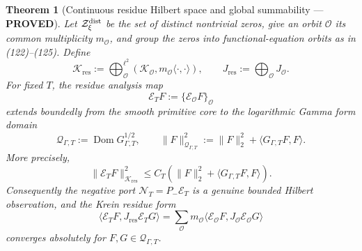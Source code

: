 \documentclass[11pt]{article}
\newtheorem{theorem}{Theorem}
\newcommand{\PROVED}{\textcolor{green!45!black}{\textbf{PROVED}}}
\begin{document}
\begin{theorem}[Continuous residue Hilbert space and global summability ---
\PROVED]
Let \(\mathcal Z_\xi^{\rm dist}\) be the set of distinct nontrivial
zeros, give an orbit \(\mathcal O\) its common multiplicity
\(m_{\mathcal O}\), and group the zeros into functional-equation orbits as
in (122)--(125).  Define
\begin{equation}
 \mathscr K_{\mathrm{res}}
 :=\bigoplus_{\mathcal O}^{\ell^2}
   (\mathcal K_{\mathcal O},m_{\mathcal O}\langle\cdot,\cdot\rangle),
 \qquad
 J_{\mathrm{res}}:=\bigoplus_{\mathcal O}J_{\mathcal O}.       \tag{547}
\end{equation}
For fixed \(T\), the residue analysis map
\begin{equation}
 \mathcal E_TF:=\{\mathcal E_{\mathcal O}F\}_{\mathcal O}      \tag{548}
\end{equation}
extends boundedly from the smooth primitive core to the logarithmic Gamma
form domain
\[
 \mathcal Q_{\Gamma,T}:=
 \operatorname{Dom}G_{\Gamma,T}^{1/2},\qquad
 \|F\|_{\mathcal Q_{\Gamma,T}}^2
 :=\|F\|_2^2+\langle G_{\Gamma,T}F,F\rangle .
\]
More precisely,
\begin{equation}
 \|\mathcal E_TF\|_{\mathscr K_{\mathrm{res}}}^2
 \le C_T\left(\|F\|_2^2+
              \langle G_{\Gamma,T}F,F\rangle\right).          \tag{549}
\end{equation}
Consequently the negative port
\(\mathcal N_T=P_-\mathcal E_T\) is a genuine bounded Hilbert observation,
and the Krein residue form
\begin{equation}
 \langle\mathcal E_TF,J_{\mathrm{res}}\mathcal E_TG\rangle
 =\sum_{\mathcal O}m_{\mathcal O}
   \langle\mathcal E_{\mathcal O}F,
          J_{\mathcal O}\mathcal E_{\mathcal O}G\rangle        \tag{550}
\end{equation}
converges absolutely for \(F,G\in\mathcal Q_{\Gamma,T}\).
\end{theorem}
\end{document}
